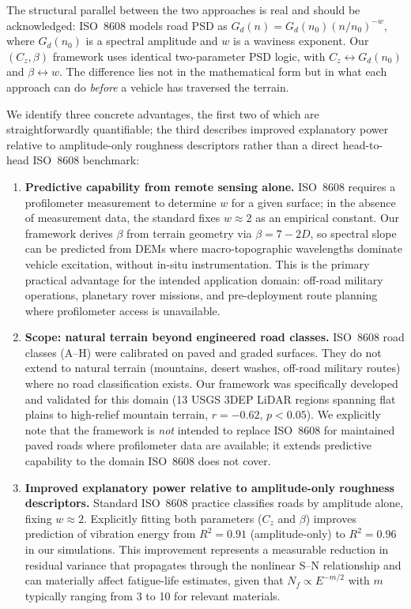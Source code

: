 \documentclass[11pt]{article}
\begin{document}
The structural parallel between the two approaches is real and should be acknowledged: ISO~8608 models road PSD as $G_d(n) = G_d(n_0)(n/n_0)^{-w}$, where $G_d(n_0)$ is a spectral amplitude and $w$ is a waviness exponent. Our $(C_z,\beta)$ framework uses identical two-parameter PSD logic, with $C_z \leftrightarrow G_d(n_0)$ and $\beta \leftrightarrow w$. The difference lies not in the mathematical form but in what each approach can do \emph{before} a vehicle has traversed the terrain.

We identify three concrete advantages, the first two of which are straightforwardly quantifiable; the third describes improved explanatory power relative to amplitude-only roughness descriptors rather than a direct head-to-head ISO~8608 benchmark:

\begin{enumerate}[leftmargin=*, label=(\roman*)]

\item \textbf{Predictive capability from remote sensing alone.}
ISO~8608 requires a profilometer measurement to determine $w$ for a given surface; in the absence of measurement data, the standard fixes $w \approx 2$ as an empirical constant. Our framework derives $\beta$ from terrain geometry via $\beta = 7-2D$, so spectral slope can be predicted from DEMs where macro-topographic wavelengths dominate vehicle excitation, without in-situ instrumentation. This is the primary practical advantage for the intended application domain: off-road military operations, planetary rover missions, and pre-deployment route planning where profilometer access is unavailable.

\item \textbf{Scope: natural terrain beyond engineered road classes.}
ISO~8608 road classes (A--H) were calibrated on paved and graded surfaces. They do not extend to natural terrain (mountains, desert washes, off-road military routes) where no road classification exists. Our framework was specifically developed and validated for this domain (13 USGS 3DEP LiDAR regions spanning flat plains to high-relief mountain terrain, $r = -0.62$, $p < 0.05$). We explicitly note that the framework is \emph{not} intended to replace ISO~8608 for maintained paved roads where profilometer data are available; it extends predictive capability to the domain ISO~8608 does not cover.

\item \textbf{Improved explanatory power relative to amplitude-only roughness descriptors.}
Standard ISO~8608 practice classifies roads by amplitude alone, fixing $w \approx 2$. Explicitly fitting both parameters ($C_z$ and $\beta$) improves prediction of vibration energy from $R^2 = 0.91$ (amplitude-only) to $R^2 = 0.96$ in our simulations. This improvement represents a measurable reduction in residual variance that propagates through the nonlinear S--N relationship and can materially affect fatigue-life estimates, given that $N_f \propto E^{-m/2}$ with $m$ typically ranging from 3 to 10 for relevant materials.

\end{enumerate}
\end{document}

